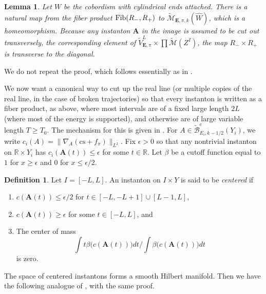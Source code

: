 \documentclass[10pt,a4paper]{amsart}
\newtheorem{lemma}[theorem]{Lemma}
\theoremstyle{definition}
\newtheorem{definition}[theorem]{Definition}
\theoremstyle{remark}
\numberwithin{figure}{qchap}
\begin{document}
\begin{lemma}\label{fibertest}Let $W$ be the cobordism with cylindrical ends attached. There is a natural map from the fiber product $\textup{Fib}(R_-, R_+)$ to $\widetilde{\mathcal M}_{\mathbf{E},\pi,k}(\hat W)$, which is a homeomorphism. Because any instanton $\mathbf{A}$ in the image is assumed to be cut out transversely, the corresponding element of $\widetilde{V}^L_{\mathbf{E},\pi} \times \prod \widetilde{\mathcal M}(Z^I)$, the map $R_- \times R_+$ is transverse to the diagonal.
\end{lemma}
We do not repeat the proof, which follows essentially as in \cite[Theorem~19.1.4]{KMSW}.

We now want a canonical way to cut up the real line (or multiple copies of the real line, in the case of broken trajectories) so that every instanton is written as a fiber product, as above, where most intervals are of a fixed large length $2L$ (where most of the energy is supported), and otherwise are of large variable length $T \geq T_0$. The mechanism for this is given in \cite[Section~19.2]{KMSW}. For $A \in \widetilde{\mathcal B}^e_{E_i,k-1/2}(Y_i)$, we write $c_i(A) = \|\nabla_A(\text{cs}+f_\pi)\|_{L^2}$.
Fix $\epsilon > 0$ so that any nontrivial instanton on $\mathbb R \times Y_i$ has $c_i(\mathbf{A}(t)) \leq \epsilon$ for some $t \in \mathbb R$. Let $\beta$ be a cutoff function equal to $1$ for $x \geq \epsilon$ and $0$ for $x \leq \epsilon/2$.

\begin{definition}Let $I = [-L, L]$. An instanton on $I \times Y$ is said to be \emph{centered} if
\begin{enumerate}
\item $c(\mathbf{A}(t)) \leq \epsilon/2$ for $t \in [-L, -L+1] \cup [L-1, L]$, \\
\item $c(\mathbf{A}(t)) \geq \epsilon$ for some $t \in [-L, L]$, and\\
\item The center of mass $$\int t \beta\big(c(\mathbf{A}(t))\big) dt \Big/ \int \beta\big(c(\mathbf{A}(t))\big) dt$$ is zero.
\end{enumerate}
\end{definition}

The space of centered instantons forms a smooth Hilbert manifold. Then we have the following analogue of \cite[Proposition~24.7.3]{KMSW}, with the same proof.
\end{document}
